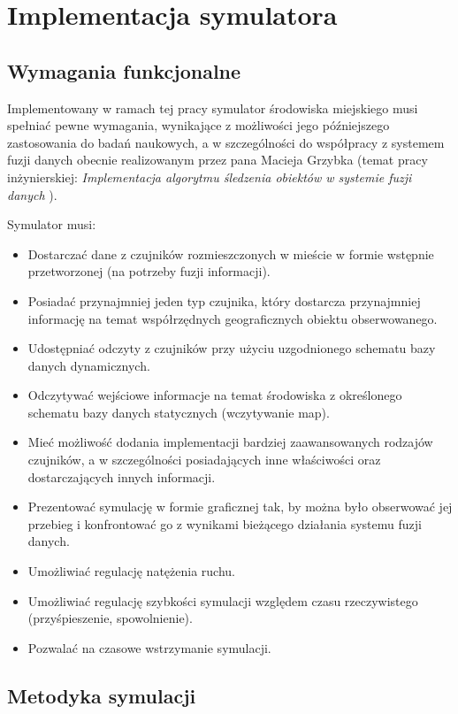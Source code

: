 \chapter{Implementacja symulatora}
\section[Wymagania funkcjonalne][Wymagania funkcjonalne]{Wymagania funkcjonalne}

\par{
Implementowany w ramach tej pracy symulator środowiska miejskiego musi spełniać pewne wymagania, wynikające z możliwości jego późniejszego zastosowania do badań naukowych, a w szczególności do współpracy z systemem fuzji danych obecnie realizowanym przez pana Macieja Grzybka (temat pracy inżynierskiej: \textit{Implementacja algorytmu śledzenia obiektów w systemie fuzji danych} \cite{Grzybek}).
}
\par{
Symulator musi:
\begin{itemize}
	\item Dostarczać dane z czujników rozmieszczonych w mieście w formie wstępnie przetworzonej (na potrzeby fuzji informacji).
	\item Posiadać przynajmniej jeden typ czujnika, który dostarcza przynajmniej informację na temat współrzędnych geograficznych obiektu obserwowanego.
	\item Udostępniać odczyty z czujników przy użyciu uzgodnionego schematu bazy danych dynamicznych.
	\item Odczytywać wejściowe informacje na temat środowiska z określonego schematu bazy danych statycznych (wczytywanie map).
	\item Mieć możliwość dodania implementacji bardziej zaawansowanych rodzajów czujników, a w szczególności posiadających inne właściwości oraz dostarczających innych informacji.
	\item Prezentować symulację w formie graficznej tak, by można było obserwować jej przebieg i konfrontować go z wynikami bieżącego działania systemu fuzji danych.
	\item Umożliwiać regulację natężenia ruchu.
	\item Umożliwiać regulację szybkości symulacji względem czasu rzeczywistego (przyśpieszenie, spowolnienie).
	\item Pozwalać na czasowe wstrzymanie symulacji.
\end{itemize}
}

\section[Metodyka symulacji][Metodyka symulacji]{Metodyka symulacji}
